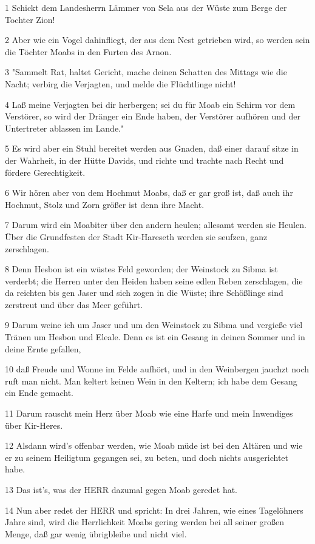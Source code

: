 \par 1 Schickt dem Landesherrn Lämmer von Sela aus der Wüste zum Berge der Tochter Zion!
\par 2 Aber wie ein Vogel dahinfliegt, der aus dem Nest getrieben wird, so werden sein die Töchter Moabs in den Furten des Arnon.
\par 3 "Sammelt Rat, haltet Gericht, mache deinen Schatten des Mittags wie die Nacht; verbirg die Verjagten, und melde die Flüchtlinge nicht!
\par 4 Laß meine Verjagten bei dir herbergen; sei du für Moab ein Schirm vor dem Verstörer, so wird der Dränger ein Ende haben, der Verstörer aufhören und der Untertreter ablassen im Lande."
\par 5 Es wird aber ein Stuhl bereitet werden aus Gnaden, daß einer darauf sitze in der Wahrheit, in der Hütte Davids, und richte und trachte nach Recht und fördere Gerechtigkeit.
\par 6 Wir hören aber von dem Hochmut Moabs, daß er gar groß ist, daß auch ihr Hochmut, Stolz und Zorn größer ist denn ihre Macht.
\par 7 Darum wird ein Moabiter über den andern heulen; allesamt werden sie Heulen. Über die Grundfesten der Stadt Kir-Hareseth werden sie seufzen, ganz zerschlagen.
\par 8 Denn Hesbon ist ein wüstes Feld geworden; der Weinstock zu Sibma ist verderbt; die Herren unter den Heiden haben seine edlen Reben zerschlagen, die da reichten bis gen Jaser und sich zogen in die Wüste; ihre Schößlinge sind zerstreut und über das Meer geführt.
\par 9 Darum weine ich um Jaser und um den Weinstock zu Sibma und vergieße viel Tränen um Hesbon und Eleale. Denn es ist ein Gesang in deinen Sommer und in deine Ernte gefallen,
\par 10 daß Freude und Wonne im Felde aufhört, und in den Weinbergen jauchzt noch ruft man nicht. Man keltert keinen Wein in den Keltern; ich habe dem Gesang ein Ende gemacht.
\par 11 Darum rauscht mein Herz über Moab wie eine Harfe und mein Inwendiges über Kir-Heres.
\par 12 Alsdann wird's offenbar werden, wie Moab müde ist bei den Altären und wie er zu seinem Heiligtum gegangen sei, zu beten, und doch nichts ausgerichtet habe.
\par 13 Das ist's, was der HERR dazumal gegen Moab geredet hat.
\par 14 Nun aber redet der HERR und spricht: In drei Jahren, wie eines Tagelöhners Jahre sind, wird die Herrlichkeit Moabs gering werden bei all seiner großen Menge, daß gar wenig übrigbleibe und nicht viel.

